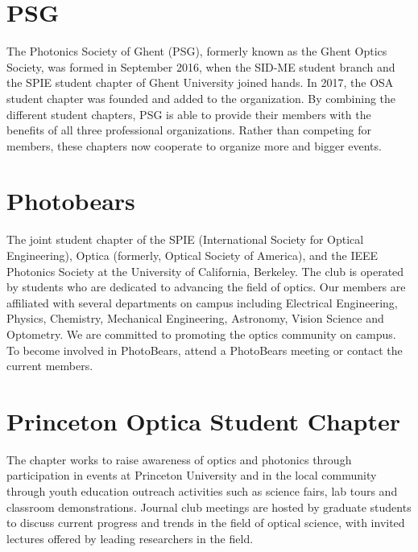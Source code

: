 \documentclass[10pt, a4paper, twocolumn]{article}
\begin{document}

    \twocolumn[
    \begin{@twocolumnfalse}
        \maketitle
        \begin{abstract}
        \abstractText
        \newline
        \end{abstract}
    \end{@twocolumnfalse}
    ]

    \section{PSG}
    The Photonics Society of Ghent (PSG), formerly known as the Ghent Optics Society, was formed in September 2016, when the SID-ME student branch and the SPIE student chapter of Ghent University joined hands.  In 2017, the OSA student chapter was founded and added to the organization.
    By combining the different student chapters, PSG is able to provide their members with the benefits of all three professional organizations.
    Rather than competing for members, these chapters now cooperate to organize more and bigger events.

    \section{Photobears}
    The joint student chapter of the SPIE (International Society for Optical Engineering), Optica (formerly, Optical Society of America), and the IEEE Photonics Society at the University of California, Berkeley.
    The club is operated by students who are dedicated to advancing the field of optics.
    Our members are affiliated with several departments on campus including Electrical Engineering, Physics, Chemistry, Mechanical Engineering, Astronomy, Vision Science and Optometry.
    We are committed to promoting the optics community on campus. To become involved in PhotoBears, attend a PhotoBears meeting or contact the current members.

    \section{Princeton Optica Student Chapter}
    The chapter works to raise awareness of optics and photonics through participation in events at Princeton University and in the local community through youth education outreach activities such as science fairs, lab tours and classroom demonstrations.
    Journal club meetings are hosted by graduate students to discuss current progress and trends in the field of optical science, with invited lectures offered by leading researchers in the field.
\end{document}

